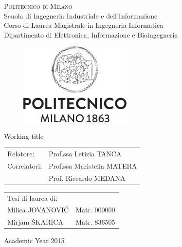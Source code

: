 \begin{titlepage}

\begin{center}
\Large{\textsc{Politecnico di Milano}}\\
\Large{Scuola di Ingegneria Industriale e dell'Informazione}\\
\large{Corso di Laurea Magistrale in Ingegneria Informatica}\\
\large{Dipartimento di Elettronica, Informazione e Bioingegneria}
\par\end{center}

\vspace{0.5cm}


\begin{center}
\begin{figure}[h]
\centering{}\includegraphics[width=0.5\textwidth]{00-frontpage/logo-polimi.png}
\end{figure}
\vspace{1cm}

\par\end{center}

\begin{center}
\LARGE{Working title}\vspace{2cm}

\par\end{center}

\begin{flushleft}
\begin{tabular}{ll}
Relatore:  & Prof.ssa Letizia TANCA\tabularnewline
Correlatori:  & Prof.ssa Maristella MATERA\tabularnewline
	& Prof. Riccardo MEDANA
\end{tabular}\vspace{1cm}

\par\end{flushleft}

\begin{flushright}
\begin{tabular}{ll}
Tesi di laurea di: & \tabularnewline
Milica JOVANOVI\'{C} & Matr. 000000\tabularnewline
Mirjam \v{S}KARICA & Matr. 836505\tabularnewline
\end{tabular}\vspace{2.2cm}

\par\end{flushright}

\begin{center}
{\large{}Academic Year 2015}
\par\end{center}{\large \par}

\end{titlepage}
